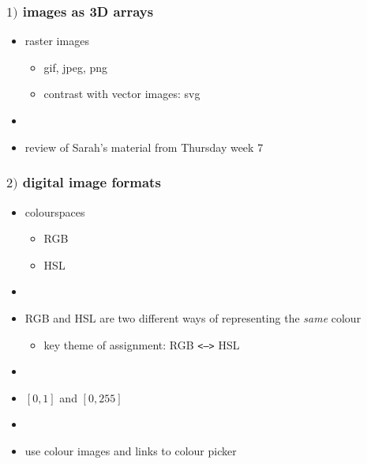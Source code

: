 \documentclass[english,14pt]{beamer}
\begin{document}

\begin{frame}[fragile]

\frametitle{$1)$ images as 3D arrays}

\begin{itemize}


	\item raster images
	\begin{itemize}
		\item gif, jpeg, png
		\item contrast with vector images: svg
	\end{itemize}

	\item[]
	
	\item review of Sarah's material from Thursday week 7
\end{itemize}

\end{frame}


\begin{frame}[fragile]

\frametitle{$2)$ digital image formats}

\begin{itemize}

	\item colourspaces
	\begin{itemize}
		\item RGB
		\item HSL
	\end{itemize}
	\item[]
	\item RGB and HSL are two different ways of representing the \emph{same} colour
	\begin{itemize}
		\item key theme of assignment: RGB \texttt{<-->} HSL
	\end{itemize}
	\item[]
	\item $[0,1]$ and $[0,255]$
	\item[]
	\item use colour images and links to colour picker
\end{itemize}

\end{frame}
\end{document}
